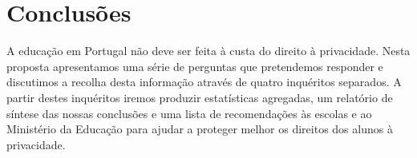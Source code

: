 \documentclass[twoside,twocolumn]{article}
\begin{document}
\section{Conclusões}

A educação em Portugal não deve ser feita à custa do direito à privacidade. Nesta proposta apresentamos uma série de perguntas que pretendemos responder e discutimos a recolha desta informação através de quatro inquéritos separados. A partir destes inquéritos iremos produzir estatísticas agregadas, um relatório de síntese das nossas conclusões e uma lista de recomendações às escolas e ao Ministério da Educação para ajudar a proteger melhor os direitos dos alunos à privacidade.








\end{document}
